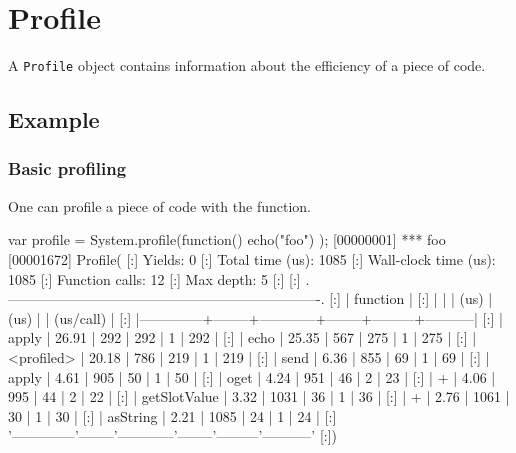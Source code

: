 
\section{Profile}

A \lstinline|Profile| object contains information about the efficiency of a
piece of code.

\subsection{Example}

\subsubsection{Basic profiling}

One can profile a piece of code with the  function.

\begin{urbiscript}
var profile = System.profile(function() { echo("foo") });
[00000001] *** foo
[00001672] Profile(
[:]  Yields:                    0
[:]  Total time (us):        1085
[:]  Wall-clock time (us):   1085
[:]  Function calls:           12
[:]  Max depth:                 5
[:]
[:]  .-------------------------------------------------------------------.
[:]  |   function   |   %
[:]  |              |        |    (us)    |  (us)  |         | (us/call) |
[:]  |--------------+--------+------------+--------+---------+-----------|
[:]  |        apply |  26.91 |        292 |    292 |       1 |       292 |
[:]  |         echo |  25.35 |        567 |    275 |       1 |       275 |
[:]  |   <profiled> |  20.18 |        786 |    219 |       1 |       219 |
[:]  |         send |   6.36 |        855 |     69 |       1 |        69 |
[:]  |        apply |   4.61 |        905 |     50 |       1 |        50 |
[:]  |         oget |   4.24 |        951 |     46 |       2 |        23 |
[:]  |            + |   4.06 |        995 |     44 |       2 |        22 |
[:]  | getSlotValue |   3.32 |       1031 |     36 |       1 |        36 |
[:]  |            + |   2.76 |       1061 |     30 |       1 |        30 |
[:]  |     asString |   2.21 |       1085 |     24 |       1 |        24 |
[:]  '--------------'--------'------------'--------'---------'-----------'
[:])
\end{urbiscript}

